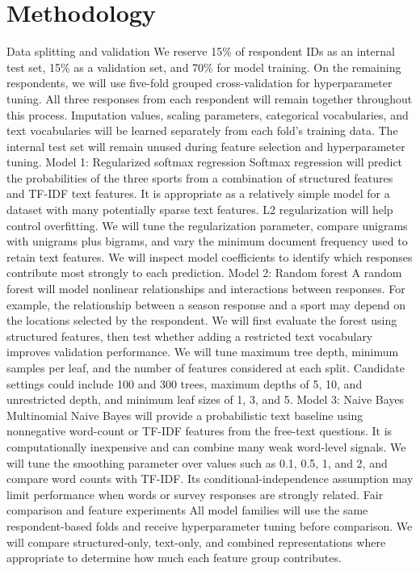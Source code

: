\documentclass[12pt]{article}
\begin{document}
\section{Methodology}\label{sec:methodology}
Data splitting and validation
We reserve 15\% of respondent IDs as an internal test set, 15\% as a validation set, and 70\% for model training. On the remaining respondents, we will use five-fold grouped cross-validation for hyperparameter tuning. All three responses from each respondent will remain together throughout this process.
Imputation values, scaling parameters, categorical vocabularies, and text vocabularies will be learned separately from each fold’s training data. The internal test set will remain unused during feature selection and hyperparameter tuning.
Model 1: Regularized softmax regression
Softmax regression will predict the probabilities of the three sports from a combination of structured features and TF-IDF text features. It is appropriate as a relatively simple model for a dataset with many potentially sparse text features. L2 regularization will help control overfitting.
We will tune the regularization parameter, compare unigrams with unigrams plus bigrams, and vary the minimum document frequency used to retain text features. We will inspect model coefficients to identify which responses contribute most strongly to each prediction.
Model 2: Random forest
A random forest will model nonlinear relationships and interactions between responses. For example, the relationship between a season response and a sport may depend on the locations selected by the respondent.
We will first evaluate the forest using structured features, then test whether adding a restricted text vocabulary improves validation performance. We will tune maximum tree depth, minimum samples per leaf, and the number of features considered at each split. Candidate settings could include 100 and 300 trees, maximum depths of 5, 10, and unrestricted depth, and minimum leaf sizes of 1, 3, and 5.
Model 3: Naive Bayes
Multinomial Naive Bayes will provide a probabilistic text baseline using nonnegative word-count or TF-IDF features from the free-text questions. It is computationally inexpensive and can combine many weak word-level signals.
We will tune the smoothing parameter over values such as 0.1, 0.5, 1, and 2, and compare word counts with TF-IDF. Its conditional-independence assumption may limit performance when words or survey responses are strongly related.
Fair comparison and feature experiments
All model families will use the same respondent-based folds and receive hyperparameter tuning before comparison. We will compare structured-only, text-only, and combined representations where appropriate to determine how much each feature group contributes.
\end{document}
